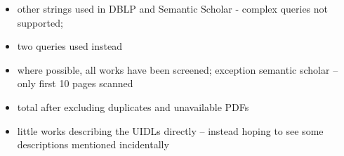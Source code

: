 \begin{itemize}
    \item other strings used in DBLP and Semantic Scholar - complex queries not supported;
    \item two queries used instead
    \item where possible, all works have been screened; exception semantic scholar -- only first 10 pages scanned
    \item total after excluding duplicates and unavailable PDFs
    \item little works describing the UIDLs directly -- instead hoping to see some descriptions mentioned incidentally
\end{itemize}
